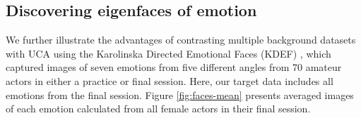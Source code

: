 \documentclass[12pt]{article}
\begin{document}




\subsection{\label{sec:faces}Discovering eigenfaces of emotion}

        We further illustrate the advantages of contrasting multiple background datasets with UCA using the Karolinska Directed Emotional Faces (KDEF) \cite{Calvo2008}, which captured images of seven emotions from five different angles from 70 amateur actors in either a practice or final session. Here, our target data includes all emotions from the final session. Figure \ref{fig:faces-mean} presents averaged images of each emotion calculated from all female actors in their final session. 
\end{document}
